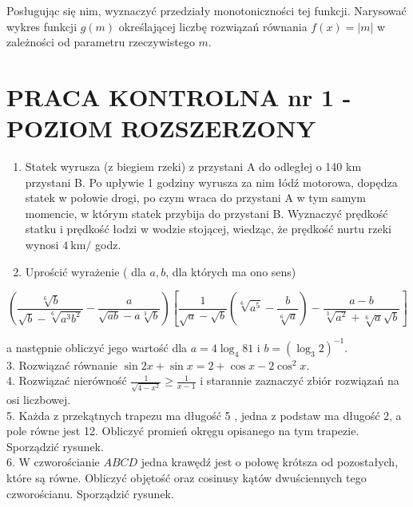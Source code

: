 \documentclass[10pt]{article}
\begin{document}
Posługując się nim, wyznaczyć przedziały monotoniczności tej funkcji. Narysować wykres funkcji $g(m)$ określającej liczbę rozwiązań równania $f(x)=|m|$ w zależności od parametru rzeczywistego $m$.

\section*{PRACA KONTROLNA nr 1 - POZIOM ROZSZERZONY}
\begin{enumerate}
  \item Statek wyrusza (z biegiem rzeki) z przystani A do odległej o 140 km przystani B. Po upływie 1 godziny wyrusza za nim łódź motorowa, dopędza statek w połowie drogi, po czym wraca do przystani A w tym samym momencie, w którym statek przybija do przystani B. Wyznaczyć prędkość statku i prędkość łodzi w wodzie stojącej, wiedząc, że prędkość nurtu rzeki wynosi $4 \mathrm{~km} /$ godz.
  \item Uprościć wyrażenie ( dla $a, b$, dla których ma ono sens)
\end{enumerate}

$$
\left(\frac{\sqrt[6]{b}}{\sqrt{b}-\sqrt[6]{a^{3} b^{2}}}-\frac{a}{\sqrt{a b}-a \sqrt[3]{b}}\right)\left[\frac{1}{\sqrt{a}-\sqrt{b}}\left(\sqrt[6]{a^{5}}-\frac{b}{\sqrt[6]{a}}\right)-\frac{a-b}{\sqrt[3]{a^{2}}+\sqrt[6]{a} \sqrt{b}}\right]
$$

a następnie obliczyć jego wartość dla $a=4 \log _{4} 81$ i $b=\left(\log _{3} 2\right)^{-1}$.\\
3. Rozwiązać równanie $\sin 2 x+\sin x=2+\cos x-2 \cos ^{2} x$.\\
4. Rozwiązać nierówność $\frac{1}{\sqrt{4-x^{2}}} \geqslant \frac{1}{x-1}$ i starannie zaznaczyć zbiór rozwiązań na osi liczbowej.\\
5. Każda z przekątnych trapezu ma długość 5 , jedna z podstaw ma długość 2, a pole równe jest 12. Obliczyć promień okręgu opisanego na tym trapezie. Sporządzić rysunek.\\
6. W czworościanie $A B C D$ jedna krawędź jest o połowę krótsza od pozostałych, które są równe. Obliczyć objętość oraz cosinusy kątów dwuściennych tego czworościanu. Sporządzić rysunek.
\end{document}
